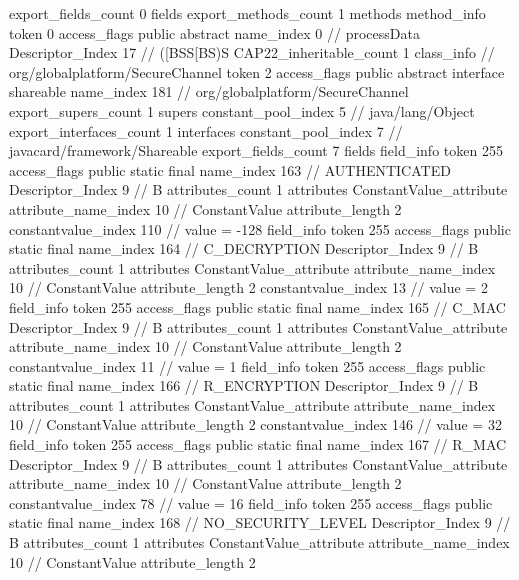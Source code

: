 {{{			export_fields_count	0
			fields {
			}
			export_methods_count	1
			methods {
				method_info {
					token	0
					access_flags	public abstract
					name_index	0		// processData
					Descriptor_Index	17		// ([BSS[BS)S
				}
			}
			CAP22_inheritable_count	1
		}
		class_info {		// org/globalplatform/SecureChannel
			token	2
			access_flags	public abstract interface shareable
			name_index	181		// org/globalplatform/SecureChannel
			export_supers_count	1
			supers {
				constant_pool_index	5		// java/lang/Object
			}
			export_interfaces_count	1
			interfaces {
				constant_pool_index	7		// javacard/framework/Shareable
			}
			export_fields_count	7
			fields {
			field_info {
				token	255
				access_flags	public static final
				name_index	163		// AUTHENTICATED
				Descriptor_Index	9		// B
				attributes_count	1
				attributes {
				ConstantValue_attribute {
					attribute_name_index	10		// ConstantValue
					attribute_length	2
					constantvalue_index	110		// value = -128
				}
				}
			}
			field_info {
				token	255
				access_flags	public static final
				name_index	164		// C_DECRYPTION
				Descriptor_Index	9		// B
				attributes_count	1
				attributes {
				ConstantValue_attribute {
					attribute_name_index	10		// ConstantValue
					attribute_length	2
					constantvalue_index	13		// value = 2
				}
				}
			}
			field_info {
				token	255
				access_flags	public static final
				name_index	165		// C_MAC
				Descriptor_Index	9		// B
				attributes_count	1
				attributes {
				ConstantValue_attribute {
					attribute_name_index	10		// ConstantValue
					attribute_length	2
					constantvalue_index	11		// value = 1
				}
				}
			}
			field_info {
				token	255
				access_flags	public static final
				name_index	166		// R_ENCRYPTION
				Descriptor_Index	9		// B
				attributes_count	1
				attributes {
				ConstantValue_attribute {
					attribute_name_index	10		// ConstantValue
					attribute_length	2
					constantvalue_index	146		// value = 32
				}
				}
			}
			field_info {
				token	255
				access_flags	public static final
				name_index	167		// R_MAC
				Descriptor_Index	9		// B
				attributes_count	1
				attributes {
				ConstantValue_attribute {
					attribute_name_index	10		// ConstantValue
					attribute_length	2
					constantvalue_index	78		// value = 16
				}
				}
			}
			field_info {
				token	255
				access_flags	public static final
				name_index	168		// NO_SECURITY_LEVEL
				Descriptor_Index	9		// B
				attributes_count	1
				attributes {
				ConstantValue_attribute {
					attribute_name_index	10		// ConstantValue
					attribute_length	2
}}}}}}}
